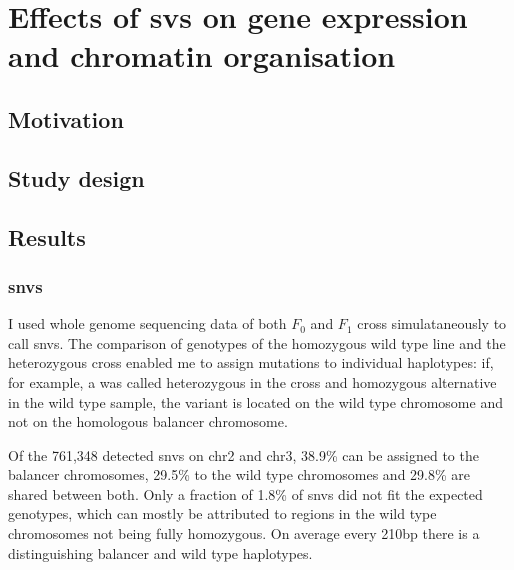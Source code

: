 \chapter{Effects of \acsp{sv} on gene expression and chromatin organisation}
\label{sec:balancer}

\section{Motivation}

\section{Study design}

\section{Results}

\subsection{\Acp{snv}}
I used whole genome sequencing data of both $F_0$ and $F_1$ cross
simulataneously to call \acp{snv}. The comparison of genotypes of the homozygous
wild type line and the heterozygous cross enabled me to assign mutations to
individual haplotypes: if, for example, a \snv was called heterozygous in the
cross and homozygous alternative in the wild type sample, the variant is located
on the wild type chromosome and not on the homologous balancer chromosome.

Of the 761,348 detected \acp{snv} on \ac{chr2} and \ac{chr3}, 38.9\% can be
assigned to the balancer chromosomes, 29.5\% to the wild type chromosomes and
29.8\% are shared between both. Only a fraction of 1.8\% of \acp{snv} did not
fit the expected genotypes, which can mostly be attributed to regions in the
wild type chromosomes not being fully homozygous.
On average every 210bp there is a \snv distinguishing balancer and wild type
haplotypes.

